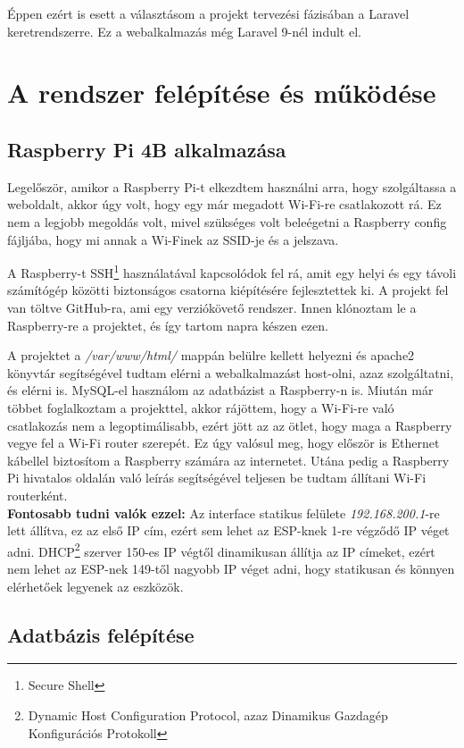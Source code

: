 \documentclass[
]{thesis-ekf}
\theoremstyle{definition}
\theoremstyle{remark}
\begin{document}
	Éppen ezért is esett a választásom a projekt tervezési fázisában a Laravel keretrendszerre. Ez a webalkalmazás még Laravel 9-nél indult el.
	
	\chapter{A rendszer felépítése és működése}
	\section{Raspberry Pi 4B alkalmazása}
	
	Legelőször, amikor a Raspberry Pi-t elkezdtem használni arra, hogy szolgáltassa a weboldalt, akkor úgy volt, hogy egy már megadott Wi-Fi-re csatlakozott rá. Ez nem a legjobb megoldás volt, mivel szükséges volt beleégetni a Raspberry config fájljába, hogy mi annak a Wi-Finek az SSID-je és a jelszava.
	
	A Raspberry-t SSH\footnote{Secure Shell} használatával kapcsolódok fel rá, amit egy helyi és egy távoli számítógép közötti biztonságos csatorna kiépítésére fejlesztettek ki.
	A projekt fel van töltve GitHub-ra\cite{github-repo}, ami egy verziókövető rendszer. Innen klónoztam le a Raspberry-re a projektet, és így tartom napra készen ezen.
	
	A projektet a \emph{/var/www/html/} mappán belülre kellett helyezni és apache2 könyvtár segítségével tudtam elérni a webalkalmazást host-olni, azaz szolgáltatni, és elérni is.
	MySQL-el használom az adatbázist a Raspberry-n is.
	Miután már többet foglalkoztam a projekttel, akkor rájöttem, hogy a Wi-Fi-re való csatlakozás nem a legoptimálisabb, ezért jött az az ötlet, hogy maga a Raspberry vegye fel a Wi-Fi router szerepét. Ez úgy valósul meg, hogy először is Ethernet kábellel biztosítom a Raspberry számára az internetet. Utána pedig a Raspberry Pi hivatalos oldalán való leírás\cite{raspberry-as-wifi} segítségével teljesen be tudtam állítani Wi-Fi routerként.\\
	\textbf{Fontosabb tudni valók ezzel:}
	Az interface statikus felülete \emph{192.168.200.1}-re lett állítva, ez az első IP cím, ezért sem lehet az ESP-knek 1-re végződő IP véget adni. DHCP\footnote{Dynamic Host Configuration Protocol, azaz Dinamikus Gazdagép Konfigurációs Protokoll} szerver 150-es IP végtől dinamikusan állítja az IP címeket, ezért nem lehet az ESP-nek 149-től nagyobb IP véget adni, hogy statikusan és könnyen elérhetőek legyenek az eszközök.
	
	\section{Adatbázis felépítése}\label{database}
	
\end{document}
